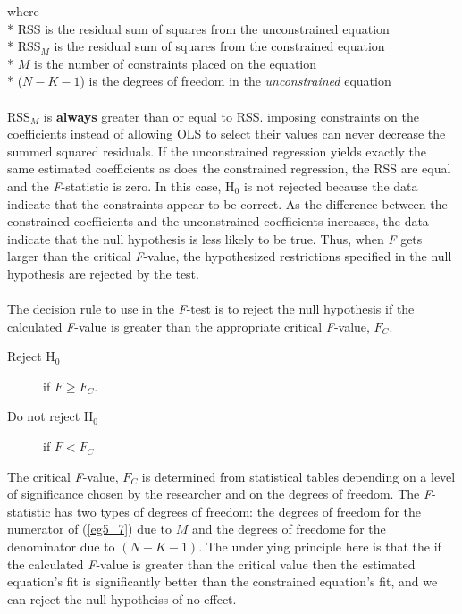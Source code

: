 \documentclass[11pt]{article}
\begin{document}
where\\*
RSS is the residual sum of squares from the unconstrained equation\\*
RSS$_M$ is the residual sum of squares from the constrained equation\\*
$M$ is the number of constraints placed on the equation\\*
($N-K-1$) is the degrees of freedom in the \textit{unconstrained} equation\\ \\
RSS$_M$ is \textbf{always} greater than or equal to RSS. imposing constraints on the coefficients instead of allowing OLS to select their values can never decrease the summed squared residuals. If the unconstrained regression yields exactly the same estimated coefficients as does the constrained regression, the RSS are equal and the \textit{F}-statistic is zero. In this case, H$_0$ is not rejected because the data indicate that the constraints appear to be correct. As the difference between the constrained coefficients and the unconstrained coefficients increases, the data indicate that the null hypothesis is less likely to be true. Thus, when \textit{F} gets larger than the critical \textit{F}-value, the hypothesized restrictions specified in the null hypothesis are rejected by the test.\\ \\
The decision rule to use in the \textit{F}-test is to reject the null hypothesis if the calculated \textit{F}-value is greater than the appropriate critical \textit{F}-value, $F_C$.
\begin{framed}
\begin{description}
\item [Reject H$_0$] if  $F \geq F_C$. 
\item [Do not reject H$_0$] if $F < F_C$
\end{description}
\end{framed}
The critical \textit{F}-value, $F_C$ is determined from statistical tables depending on a level of significance chosen by the researcher and on the degrees of freedom. The \textit{F}-statistic has two types of degrees of freedom: the degrees of freedom for the numerator of (\ref{eg5_7}) due to $M$ and the degrees of freedome for the denominator due to $(N-K-1)$. The underlying principle here is that the if the calculated \textit{F}-value is greater than the critical value then the estimated equation's fit is significantly better than the constrained equation's fit, and we can reject the null hypotheiss of no effect.
\end{document}
